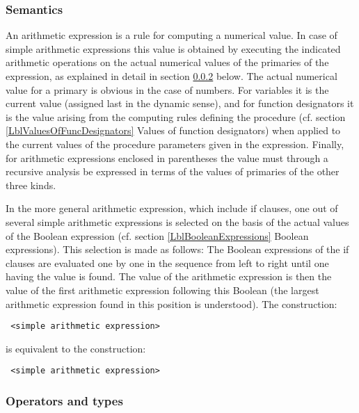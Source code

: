 \documentclass[a4paper,11pt]{article}
\begin{document}
\subsubsection{Semantics}
\label{LblArithmeticExpressionsSemantics}

An arithmetic expression is a rule for computing a numerical value.
In case of simple arithmetic expressions this value is obtained by
executing the indicated arithmetic operations on the actual numerical
values of the primaries of the expression, as explained in detail in
section \ref{LblOperatorsAndTypes} below.  The actual numerical value
for a primary is obvious in the case of numbers.  For variables it is
the current value (assigned last in the dynamic sense), and for
function designators it is the value arising from the computing rules
defining the procedure (cf. section \ref{LblValuesOfFuncDesignators}
Values of function designators) when applied to the current values of
the procedure parameters given in the expression.  Finally, for
arithmetic expressions enclosed in parentheses the value must through
a recursive analysis be expressed in terms of the values of primaries
of the other three kinds.

In the more general arithmetic expression, which include if clauses,
one out of several simple arithmetic expressions is selected on the
basis of the actual values of the Boolean expression (cf. section
\ref{LblBooleanExpressions} Boolean expressions).  This selection is
made as follows: The Boolean expressions of the if clauses are
evaluated one by one in the sequence from left to right until one
having the value  is found.  The value of the arithmetic
expression is then the value of the first arithmetic expression
following this Boolean (the largest arithmetic expression found in
this position is understood).  The construction:

\begin{flushleft}
\texttt{ <simple arithmetic expression>}\\
\end{flushleft}

is equivalent to the construction:

\begin{flushleft}
\texttt{    <simple arithmetic expression>}\\
\end{flushleft}


\subsubsection{Operators and types}
\label{LblOperatorsAndTypes}
\end{document}
